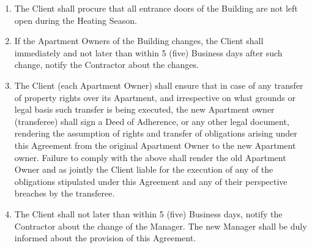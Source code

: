 \begin{multicols}{2}
\begin{enumerate}
	\item The Client shall procure that all entrance doors of the Building are not left open during the Heating Season. 
	\item If the Apartment Owners of the Building changes, the Client shall immediately and not later than within 5 (five) Business days after such change, notify the Contractor about the changes. 
	\item The Client (each Apartment Owner) shall ensure that in case of any transfer of property rights over its Apartment, and irrespective on what grounds or legal basis such transfer is being executed, the new Apartment owner (transferee) shall sign a Deed of Adherence, or any other legal document, rendering the assumption of rights and transfer of obligations arising under this Agreement from the original Apartment Owner to the new Apartment owner. Failure to comply with the above shall render the old Apartment Owner and as jointly the Client liable for the execution of any of the obligations stipulated under this Agreement and any of their perspective breaches by the transferee. 
	\item The Client shall not later than within 5 (five) Business days, notify the Contractor about the change of the Manager. The new Manager shall be duly informed about the provision of this Agreement. 
\end{enumerate}
	

\end{multicols}
